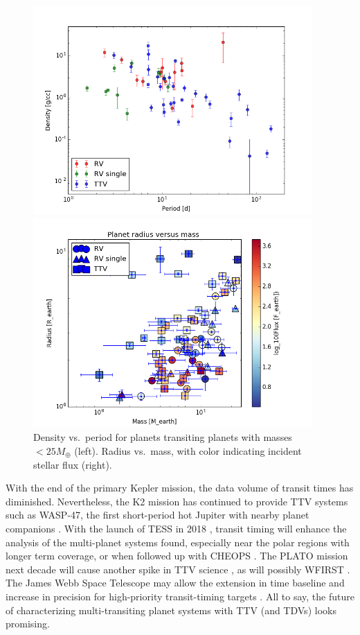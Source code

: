 \documentclass[graybox,natbib,nosecnum]{svmult}
\begin{document}
\begin{figure}
\centerline{
\includegraphics[width=0.95\textwidth]{density_vs_period_errors.png}}
\centerline{
\includegraphics[width=0.95\textwidth]{mass_radius_flux.png}}
\caption{Density vs.\ period for planets transiting planets with masses $<25 M_\oplus$ (left).  Radius
vs.\ mass, with color indicating incident stellar flux (right).}
\label{fig:density_period}
\end{figure}

With the end of the primary Kepler mission, the data volume of transit times has diminished.
Nevertheless, the K2 mission has continued to provide TTV systems such as WASP-47, the first
short-period hot Jupiter with nearby planet companions \citep{2015Becker}.  With the launch
of TESS in 2018 \citep{2015JATIS...1a4003R}, transit timing will enhance the analysis 
of the multi-planet systems found, especially near the polar regions with longer term coverage, 
or when followed up with CHEOPS \citep{2014PASP..126.1134B}. 
The PLATO mission next decade will cause another spike in TTV science \citep{2014ExA....38..249R},
as will possibly WFIRST \citep{2017PASP..129d4401M}. The James Webb Space Telescope may allow the
extension in time baseline and increase in precision for high-priority transit-timing targets 
\citep{2014PASP..126.1134B}.  All to say, the future of characterizing multi-transiting planet
systems with TTV (and TDVs) looks promising.
\end{document}
